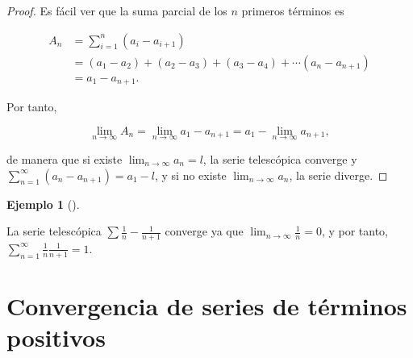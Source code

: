 \documentclass[
  a4paper,
]{scrreport}
\theoremstyle{plain}
\theoremstyle{plain}
\theoremstyle{definition}
\theoremstyle{definition}
\newtheorem{example}{Ejemplo}[chapter]
\theoremstyle{plain}
\theoremstyle{remark}
\begin{document}
\begin{tcolorbox}[enhanced jigsaw, breakable, bottomrule=.15mm, coltitle=black, bottomtitle=1mm, opacityback=0, title=\textcolor{quarto-callout-note-color}{\faInfo}\hspace{0.5em}{Demostración}, left=2mm, toptitle=1mm, toprule=.15mm, opacitybacktitle=0.6, colframe=quarto-callout-note-color-frame, arc=.35mm, colback=white, rightrule=.15mm, titlerule=0mm, leftrule=.75mm, colbacktitle=quarto-callout-note-color!10!white]

\begin{proof}

Es fácil ver que la suma parcial de los \(n\) primeros términos es

\begin{align*}
A_n &= \sum_{i=1}^n (a_i-a_{i+1})\\ 
& = (a_1-a_2)+(a_2-a_3)+(a_3-a_4)+\cdots (a_n-a_{n+1})\\ 
& = a_1-a_{n+1}.
\end{align*}

Por tanto,

\[
\lim_{n\to\infty} A_n = \lim_{n\to\infty} a_1-a_{n+1} = a_1 - \lim_{n\to\infty} a_{n+1},
\]

de manera que si existe \(\lim_{n\to\infty} a_n=l\), la serie
telescópica converge y \(\sum_{n=1}^\infty (a_n-a_{n+1}) = a_1-l\), y si
no existe \(\lim_{n\to\infty} a_n\), la serie diverge.

\end{proof}

\end{tcolorbox}

\leavevmode{}%
\begin{example}[]\label{exm-convergencia-series-telescopicas}

La serie telescópica \(\sum \frac{1}{n}-\frac{1}{n+1}\) converge ya que
\(\lim_{n\to\infty}\frac{1}{n} = 0\), y por tanto,
\(\sum_{n=1}^\infty \frac{1}{n}\frac{1}{n+1} = 1\).

\end{example}

\hypertarget{convergencia-de-series-de-tuxe9rminos-positivos}{%
\section{Convergencia de series de términos
positivos}\label{convergencia-de-series-de-tuxe9rminos-positivos}}
\end{document}
